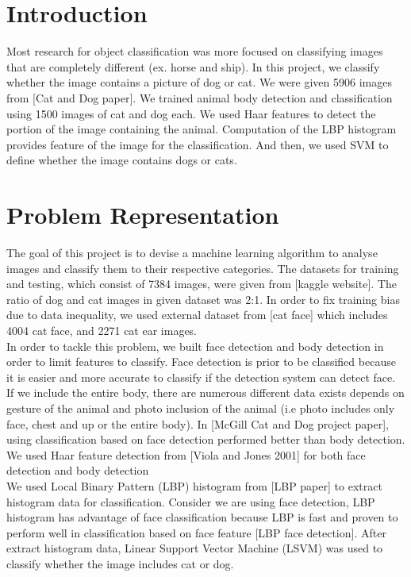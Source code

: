 \documentclass[conference,compsoc]{IEEEtran}
\begin{document}
\section{Introduction}
Most research for object classification was more focused on classifying images that are completely different (ex. horse and ship). In this project, we classify whether the image contains a picture of dog or cat. We were given 5906 images from [Cat and Dog paper]. We trained animal body detection and classification using 1500 images of cat and dog each. We used Haar features to detect the portion of the image containing the animal. Computation of the LBP histogram provides feature of the image for the classification. And then, we used  SVM to define whether the image contains dogs or cats.


\section{Problem Representation}
The goal of this project is to devise a machine learning algorithm to analyse images and classify them to their respective categories. The datasets for training and testing, which consist of 7384 images, were given from [kaggle website]. The ratio of dog and cat images in given dataset was 2:1. In order to fix training bias due to data inequality, we used external dataset from [cat face] which includes 4004 cat face, and 2271 cat ear images. \\

In order to tackle this problem, we built face detection and body detection in order to limit features to classify. Face detection is prior to be classified because it is easier and more accurate to classify if the detection system can detect face. If we include the entire body, there are numerous different data exists depends on gesture of the animal and photo inclusion of the animal (i.e photo includes only face, chest and up or the entire body). In [McGill Cat and Dog project paper], using classification based on face detection performed better than body detection. We used Haar feature detection from [Viola and Jones 2001] for both face detection and body detection\\

We used Local Binary Pattern (LBP) histogram from [LBP paper] to extract histogram data for classification. Consider we are using face detection, LBP histogram has advantage of face classification because LBP is fast and proven to perform well in classification based on face feature [LBP face detection]. After extract histogram data, Linear Support Vector Machine (LSVM) was used to classify whether the image includes cat or dog.
\end{document}

